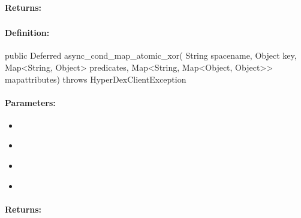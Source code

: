 \paragraph{Returns:}


\pagebreak
\subsubsection{}
\label{api:java:async_cond_map_atomic_xor}


\paragraph{Definition:}
\begin{javacode}
public Deferred async_cond_map_atomic_xor(
        String spacename,
        Object key,
        Map<String, Object> predicates,
        Map<String, Map<Object, Object>> mapattributes) throws HyperDexClientException
\end{javacode}

\paragraph{Parameters:}
\begin{itemize}[noitemsep]
\item {}\\

\item {}\\

\item {}\\

\item {}\\

\end{itemize}

\paragraph{Returns:}


